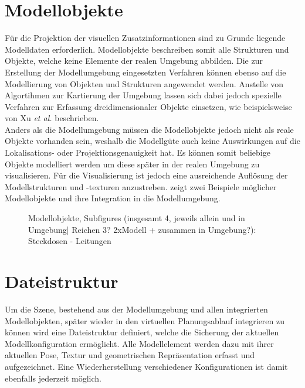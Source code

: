 \section{Modellobjekte}
Für die Projektion der visuellen Zusatzinformationen sind zu Grunde liegende Modelldaten erforderlich. Modellobjekte beschreiben somit alle Strukturen und Objekte, welche keine Elemente der realen Umgebung abbilden. Die zur Erstellung der Modellumgebung eingesetzten Verfahren können ebenso auf die Modellierung von Objekten und Strukturen angewendet werden. Anstelle von Algortihmen zur Kartierung der Umgebung lassen sich dabei jedoch spezielle Verfahren zur Erfassung dreidimensionaler Objekte einsetzen, wie beispielsweise von Xu \textit{et al.} \cite{Xu2012} beschrieben.\\

Anders als die Modellumgebung müssen die Modellobjekte jedoch nicht als reale Objekte vorhanden sein, weshalb die Modellgüte auch keine Auswirkungen auf die Lokalisations- oder Projektionsgenauigkeit hat. Es können somit beliebige Objekte modelliert werden um diese später in der realen Umgebung zu visualisieren.  Für die Visualisierung ist jedoch eine ausreichende Auflösung der Modellstrukturen und -texturen anzustreben.  zeigt zwei Beispiele möglicher Modellobjekte und ihre Integration in die Modellumgebung.\\

\begin{figure}[ht]
	\begin{center}
	\hspace{3mm}
	\caption{Modellobjekte, Subfigures (insgesamt 4, jeweils allein und in Umgebung| Reichen 3? 2xModell + zusammen in Umgebung?): Steckdosen - Leitungen}
	\label{fig.modobj}
	\end{center}
\end{figure}

\section{Dateistruktur}
Um die Szene, bestehend aus der Modellumgebung und allen integrierten Modellobjekten, später wieder in den virtuellen Planungsablauf integrieren zu können wird eine Dateistruktur definiert, welche die Sicherung der aktuellen Modellkonfiguration ermöglicht. Alle Modellelement werden dazu mit ihrer aktuellen Pose, Textur und geometrischen Repräsentation erfasst und aufgezeichnet. Eine Wiederherstellung verschiedener Konfigurationen ist damit ebenfalls jederzeit möglich.\\

